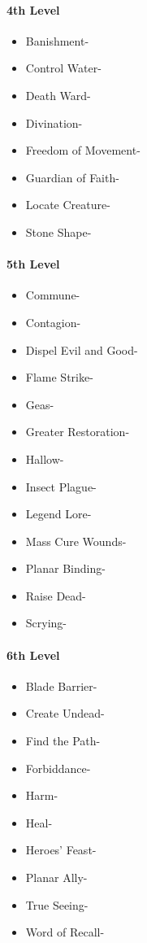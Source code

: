 \documentclass[
]{article}
\providecommand{\tightlist}{%
  \setlength{\itemsep}{0pt}\setlength{\parskip}{0pt}}
\begin{document}
\hypertarget{4th-level-1}{%
\paragraph{4th Level}\label{4th-level-1}}

\begin{itemize}
\tightlist
\item
  Banishment-
\item
  Control Water-
\item
  Death Ward-
\item
  Divination-
\item
  Freedom of Movement-
\item
  Guardian of Faith-
\item
  Locate Creature-
\item
  Stone Shape-
\end{itemize}

\hypertarget{5th-level-1}{%
\paragraph{5th Level}\label{5th-level-1}}

\begin{itemize}
\tightlist
\item
  Commune-
\item
  Contagion-
\item
  Dispel Evil and Good-
\item
  Flame Strike-
\item
  Geas-
\item
  Greater Restoration-
\item
  Hallow-
\item
  Insect Plague-
\item
  Legend Lore-
\item
  Mass Cure Wounds-
\item
  Planar Binding-
\item
  Raise Dead-
\item
  Scrying-
\end{itemize}

\hypertarget{6th-level-1}{%
\paragraph{6th Level}\label{6th-level-1}}

\begin{itemize}
\tightlist
\item
  Blade Barrier-
\item
  Create Undead-
\item
  Find the Path-
\item
  Forbiddance-
\item
  Harm-
\item
  Heal-
\item
  Heroes' Feast-
\item
  Planar Ally-
\item
  True Seeing-
\item
  Word of Recall-
\end{itemize}
\end{document}
